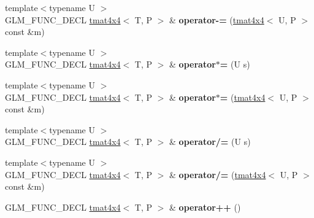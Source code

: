 \begin{DoxyCompactItemize}
\item 
\hypertarget{structglm_1_1tmat4x4_aa8385af8ad2d167f4111ab6346e4fd00}{{\footnotesize template$<$typename U $>$ }\\G\-L\-M\-\_\-\-F\-U\-N\-C\-\_\-\-D\-E\-C\-L \hyperlink{structglm_1_1tmat4x4}{tmat4x4}$<$ T, P $>$ \& {\bfseries operator-\/=} (\hyperlink{structglm_1_1tmat4x4}{tmat4x4}$<$ U, P $>$ const \&m)}\label{structglm_1_1tmat4x4_aa8385af8ad2d167f4111ab6346e4fd00}

\item 
\hypertarget{structglm_1_1tmat4x4_ab5bcd63a0b03e90c074dbca6e8c8eaea}{{\footnotesize template$<$typename U $>$ }\\G\-L\-M\-\_\-\-F\-U\-N\-C\-\_\-\-D\-E\-C\-L \hyperlink{structglm_1_1tmat4x4}{tmat4x4}$<$ T, P $>$ \& {\bfseries operator$\ast$=} (U s)}\label{structglm_1_1tmat4x4_ab5bcd63a0b03e90c074dbca6e8c8eaea}

\item 
\hypertarget{structglm_1_1tmat4x4_a5265dee9e6fd517e9d0ce28b006ad35b}{{\footnotesize template$<$typename U $>$ }\\G\-L\-M\-\_\-\-F\-U\-N\-C\-\_\-\-D\-E\-C\-L \hyperlink{structglm_1_1tmat4x4}{tmat4x4}$<$ T, P $>$ \& {\bfseries operator$\ast$=} (\hyperlink{structglm_1_1tmat4x4}{tmat4x4}$<$ U, P $>$ const \&m)}\label{structglm_1_1tmat4x4_a5265dee9e6fd517e9d0ce28b006ad35b}

\item 
\hypertarget{structglm_1_1tmat4x4_a1dff23012c9f5451ebaf7d96934f60cb}{{\footnotesize template$<$typename U $>$ }\\G\-L\-M\-\_\-\-F\-U\-N\-C\-\_\-\-D\-E\-C\-L \hyperlink{structglm_1_1tmat4x4}{tmat4x4}$<$ T, P $>$ \& {\bfseries operator/=} (U s)}\label{structglm_1_1tmat4x4_a1dff23012c9f5451ebaf7d96934f60cb}

\item 
\hypertarget{structglm_1_1tmat4x4_a0dc88dbbec27980b19dd322695bb2eab}{{\footnotesize template$<$typename U $>$ }\\G\-L\-M\-\_\-\-F\-U\-N\-C\-\_\-\-D\-E\-C\-L \hyperlink{structglm_1_1tmat4x4}{tmat4x4}$<$ T, P $>$ \& {\bfseries operator/=} (\hyperlink{structglm_1_1tmat4x4}{tmat4x4}$<$ U, P $>$ const \&m)}\label{structglm_1_1tmat4x4_a0dc88dbbec27980b19dd322695bb2eab}

\item 
\hypertarget{structglm_1_1tmat4x4_a1ad2e416dfded77b7c5b9c7cc5593a82}{G\-L\-M\-\_\-\-F\-U\-N\-C\-\_\-\-D\-E\-C\-L \hyperlink{structglm_1_1tmat4x4}{tmat4x4}$<$ T, P $>$ \& {\bfseries operator++} ()}\label{structglm_1_1tmat4x4_a1ad2e416dfded77b7c5b9c7cc5593a82}


\end{DoxyCompactItemize}
